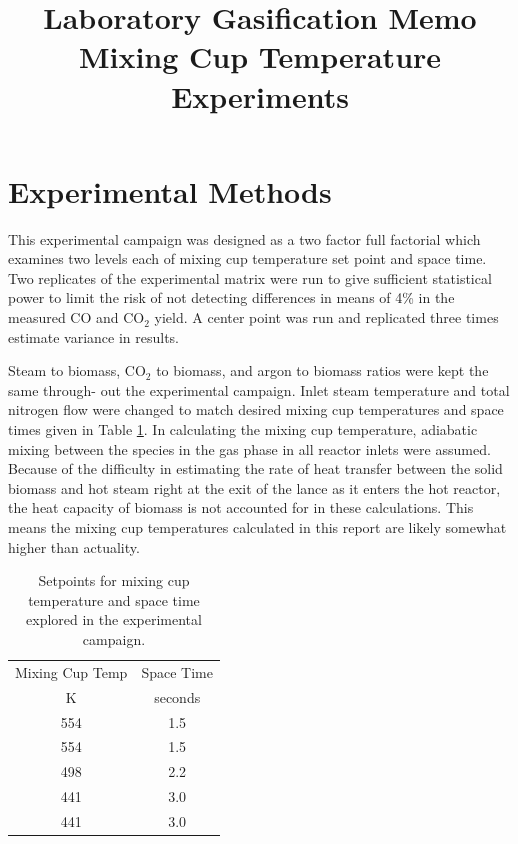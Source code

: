 \documentclass[11pt,twocolumn]{article}
\date{}
\title{Laboratory Gasification Memo\\Mixing Cup Temperature Experiments}
\begin{document}

\section*{Experimental Methods}

This experimental campaign was designed as a
two factor full factorial which examines two levels each of mixing cup temperature set point and
space time. Two replicates of the experimental
matrix were run to give sufficient statistical power
to limit the risk of not detecting differences in
means of 4\% in the measured CO and CO$_2$ yield.
A center point was run and replicated three times
estimate variance in results.

Steam to biomass, CO$_2$ to biomass, and argon
to biomass ratios were kept the same through-
out the experimental campaign. Inlet steam temperature and total nitrogen flow were changed to
match desired mixing cup temperatures and space
times given in Table \ref{mix_sp}. In calculating the mixing cup temperature, adiabatic mixing between
the species in the gas phase in all reactor inlets
were assumed. Because of the difficulty in estimating the rate of heat transfer between the solid
biomass and hot steam right at the exit of the lance as it enters the hot reactor, the heat capacity of biomass is not accounted for in these calculations. This means the mixing cup temperatures calculated in this report are likely somewhat
higher than actuality.

\begin{table}
	\centering
	\caption{Setpoints for mixing cup temperature and space time explored in the experimental campaign.}
	\label{mix_sp}
	\begin{tabular}{c c}
	Mixing Cup Temp	&	Space Time	\\
	K				&	seconds		\\
	\hline
	554				&	1.5			\\
	554				&	1.5			\\
	498				&	2.2			\\
	441				&	3.0			\\
	441				&	3.0			\\
	\end{tabular}
\end{table}
\end{document}
